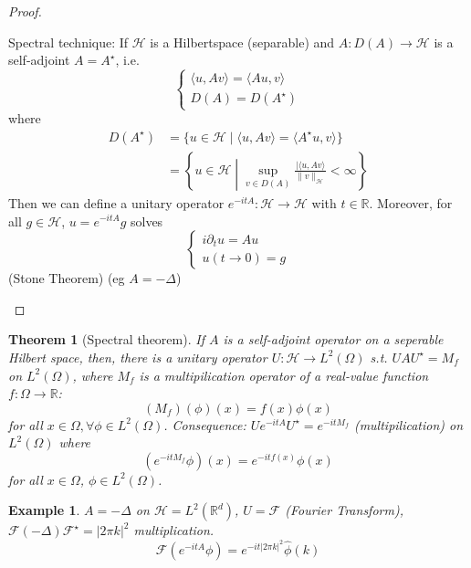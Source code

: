\documentclass{report}
\theoremstyle{tommy}
\newtheorem{thm}[defn]{Theorem}
\newtheorem{eg}[defn]{Example}
\begin{document}
\begin{proof}
\begin{enumerate}
      Spectral technique: If \(\mathcal{H}\) is a Hilbertspace (separable) and \(A: D(A) \to \mathcal{H}\) is a self-adjoint \(A = A^\star\), i.e. 
      \[\begin{cases}
        \langle u, Av \rangle = \langle A u, v \rangle \\
        D(A) = D(A^\star)
      \end{cases}\]
      where 
      \begin{align*}
        D(A^\star) &= \{u \in \mathcal{H} \mid \langle u, Av\rangle = \langle A^\star u, v \rangle \} \\
        &= \left\{ u \in \mathcal{H} \middle| \sup_{ v \in D(A)} \frac{|\langle u, Av\rangle}{\|v\|_{\mathcal{H}}} < \infty \right\}
      \end{align*}
      Then we can define a unitary operator \(e^{-it A}: \mathcal{H} \to \mathcal{H}\) with \(t \in \mathbb{R}\). Moreover, for all \(g \in \mathcal{H}\), \(u = e^{- i t A} g\) solves 
      \[\begin{cases}
        i \partial_t u = A u \\ u(t \to 0) = g
      \end{cases}\]
      (Stone Theorem) (eg \(A = -\Delta\))
    \end{enumerate}
  \end{proof}

  \begin{thm}[Spectral theorem]
    If \(A\) is a self-adjoint operator on a seperable Hilbert space, then, there is a unitary operator \(U: \mathcal{H} \to L^2(\Omega)\) s.t. 
    \(UAU^\star = M_f\) on \(L^2(\Omega)\), where \(M_f\) is a multipilication operator of a real-value function \(f: \Omega \to \mathbb{R}\):
    \[(M_f)(\phi)(x) = f(x) \phi(x)\]
    for all \(x \in \Omega, \forall \phi \in L^2(\Omega)\).
    Consequence: \(U e^{-itA} U^\star = e^{-it M_f}\) (multipilication) on \(L^2(\Omega)\) where
    \[(e^{-it M_f}\phi)(x) = e^{-it f(x)} \phi(x)\] for all \(x \in \Omega\), \(\phi \in L^2(\Omega)\).
  \end{thm}

  \begin{eg}
    \(A = - \Delta\) on \(\mathcal{H} = L^2(\mathbb{R}^d)\), \(U = \mathcal{F}\) (Fourier Transform), \(\mathcal{F} (- \Delta) \mathcal{F}^\star = |2 \pi k|^2\) multiplication.
    \[\mathcal{F}(e^{-itA} \phi) = e^{-it |2 \pi k|^2} \hat \phi(k)\]
  \end{eg}
\end{document}
